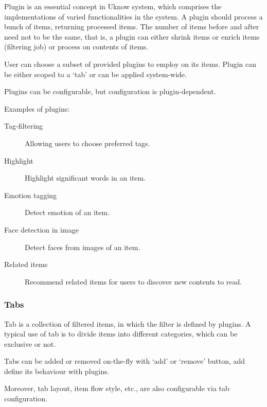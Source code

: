 Plugin is an essential concept in Uknow system, which comprises the
implementations of varied functionalities in the system. A plugin should
process a bunch of items, returning processed items. The number of items
before and after need not to be the same, that is, a plugin can either
shrink items or enrich items (filtering job) or process on contents of
items.

User can choose a subset of provided plugins to employ on its items.
Plugin can be either scoped to a `tab' or can be applied system-wide.

Plugins can be configurable, but configuration is plugin-dependent.

Examples of plugins:

\begin{description}
\item[Tag-filtering] Allowing users to choose preferred tags.
\item[Highlight] Highlight significant words in an item.
\item[Emotion tagging] Detect emotion of an item.
\item[Face detection in image] Detect faces from images of an item.
\item[Related items] Recommend related items for users to discover new contents to read.
\end{description}

\subsubsection{Tabs}

Tab is a collection of filtered items, in which the filter is defined by
plugins. A typical use of tab is to divide items into different
categories, which can be exclusive or not.

Tabs can be added or removed on-the-fly with `add' or `remove' button,
add define its behaviour with plugins.

Moreover, tab layout, item flow style, etc., are also configurable via
tab configuration.
